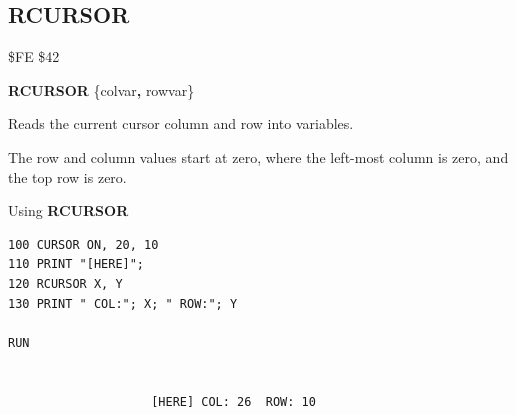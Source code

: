 
\newpage
\subsection{RCURSOR}
\begin{description}[leftmargin=2cm,style=nextline]
\item [Token:]    \$FE \$42

\item [Format:]   {\bf RCURSOR} \{colvar{\bf,} rowvar\}

\item [Usage:]    Reads the current cursor column and row into variables.

\item [Remarks:]  The row and column values start at zero, where the left-most column is zero, and the top row is zero.

\item [Example:]  Using {\bf RCURSOR}

\begin{tcolorbox}[colback=black,coltext=white]
\verbatimfont{\codefont}
\begin{verbatim}
100 CURSOR ON, 20, 10
110 PRINT "[HERE]";
120 RCURSOR X, Y
130 PRINT " COL:"; X; " ROW:"; Y

RUN


                    [HERE] COL: 26  ROW: 10
\end{verbatim}
\end{tcolorbox}
\end{description}


\newpage

